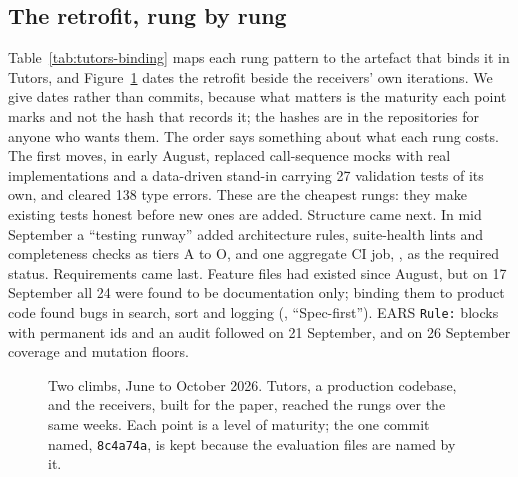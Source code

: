 \subsection{The retrofit, rung by rung}

Table~\ref{tab:tutors-binding} maps each rung pattern to the artefact that binds it in Tutors,
and Figure~\ref{fig:timeline} dates the retrofit beside the receivers' own iterations. We give
dates rather than commits, because what matters is the maturity each point marks and not the
hash that records it; the hashes are in the repositories for anyone who wants them. The order
says something about what each rung costs. The first moves, in early August, replaced
call-sequence mocks with real implementations and a data-driven stand-in carrying 27 validation
tests of its own, and cleared 138 type errors. These are the cheapest rungs: they make existing
tests honest before new ones are added. Structure came next. In mid September a ``testing
runway'' added architecture rules, suite-health lints and completeness checks as tiers A to O,
and one aggregate CI job, , as the required status. Requirements came last.
Feature files had existed since August, but on 17 September all 24 were found to be
documentation only; binding them to product code found bugs in search, sort and logging
(, ``Spec-first''). EARS \texttt{Rule:} blocks with
permanent ids and an audit followed on 21 September, and on 26 September coverage and mutation
floors.

\begin{figure}[t]
  \centering
  \resizebox{\linewidth}{!}{}
  \caption{Two climbs, June to October 2026. Tutors, a production codebase, and the
  receivers, built for the paper, reached the rungs over the same weeks. Each point is a level
  of maturity; the one commit named, \texttt{8c4a74a}, is kept because the evaluation files
  are named by it.}
  \label{fig:timeline}
\end{figure}


